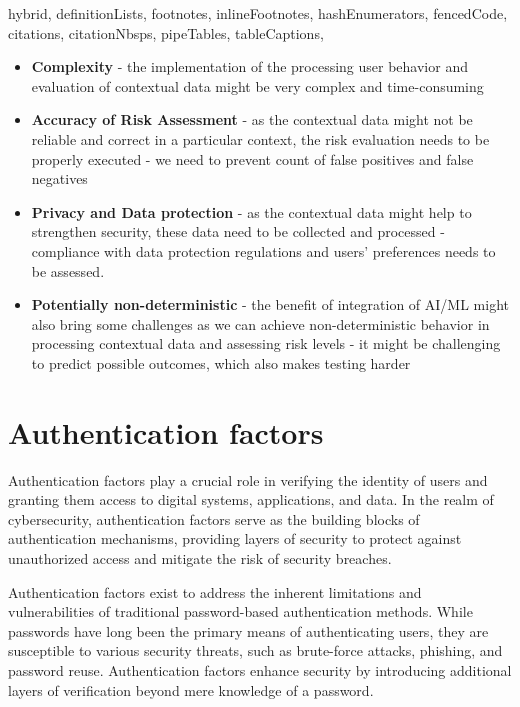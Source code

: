 \documentclass[
  digital,     %
  oneside,     %
  nosansbold,  %
  nocolorbold, %
  lof,         %
  lot,         %
]{fithesis4}
\begin{document}
\begin{markdown*}{%
  hybrid,
  definitionLists,
  footnotes,
  inlineFootnotes,
  hashEnumerators,
  fencedCode,
  citations,
  citationNbsps,
  pipeTables,
  tableCaptions,
}
\begin{itemize}
    \item \textbf{Complexity} - the implementation of the processing user behavior and evaluation of contextual data might be very complex and time-consuming  
    \item \textbf{Accuracy of Risk Assessment} - as the contextual data might not be reliable and correct in a particular context, the risk evaluation needs to be properly executed - we need to prevent count of false positives and false negatives 
    \item \textbf{Privacy and Data protection} - as the contextual data might help to strengthen security, these data need to be collected and processed - compliance with data protection regulations and users' preferences needs to be assessed.
    \item \textbf{Potentially non-deterministic} - the benefit of integration of AI/ML might also bring some challenges as we can achieve non-deterministic behavior in processing contextual data and assessing risk levels - it might be challenging to predict possible outcomes, which also makes testing harder
    
\end{itemize}

\newpage
\section{Authentication factors}
Authentication factors play a crucial role in verifying the identity of users and granting them access to digital systems, applications, and data.
In the realm of cybersecurity, authentication factors serve as the building blocks of authentication mechanisms, providing layers of security to protect against unauthorized access and mitigate the risk of security breaches.

Authentication factors exist to address the inherent limitations and vulnerabilities of traditional password-based authentication methods.
While passwords have long been the primary means of authenticating users, they are susceptible to various security threats, such as brute-force attacks, phishing, and password reuse.
Authentication factors enhance security by introducing additional layers of verification beyond mere knowledge of a password.



\end{markdown*}
\end{document}
